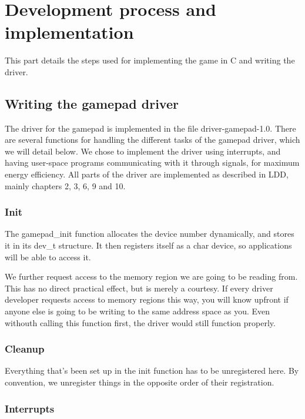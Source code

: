 \section{Development process and implementation}
\label{chap:development_process}

This part details the steps used for implementing the game in C and writing the driver.


\subsection{Writing the gamepad driver}

The driver for the gamepad is implemented in the file driver-gamepad-1.0. There are several functions for handling the different tasks of the gamepad driver, which we will detail below.
We chose to implement the driver using interrupts, and having user-space programs communicating with it through signals, for maximum energy efficiency.
All parts of the driver are implemented as described in LDD\cite{ldd}, mainly chapters 2, 3, 6, 9 and 10.

\subsubsection{Init}

The gamepad\_init function allocates the device number dynamically, and stores it in its dev\_t structure. It then registers itself as a char device, so applications will be able to access it.

We further request access to the memory region we are going to be reading from. This has no direct practical effect, but is merely a courtesy. If every driver developer requests access to memory regions this way, you will know upfront if anyone else is going to be writing to the same address space as you. Even withouth calling this function first, the driver would still function properly.

\subsubsection{Cleanup}

Everything that's been set up in the init function has to be unregistered here.
By convention, we unregister things in the opposite order of their registration.

\subsubsection{Interrupts}

